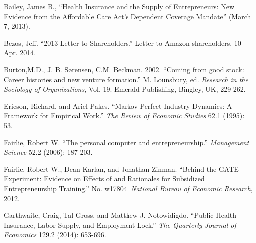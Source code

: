 \documentclass[12pt]{article}
\begin{document}
\begin{thebibliography}{99}

\begin{comment}

\bibitem{abadie}
Abadie, Alberto. ``Synthetic Control Methods for Comparative Case Studies: Estimating the Effect of California’s Tobacco Control Program.'' Journal of the American Statistical Association 105 (2010): 493-505

\bibitem{acharya}
Acharya, Viral, and Krishnamurthy Subramanian, 2009, Bankruptcy codes and innovation, \emph{Review of Financial Studies} 22, 4949-4988.

\bibitem{kaufman}
Atkinson, Robert D., Scott Andes. 2010 ``The 2010 State New Economy Index: Benchmarking Economic Transformation in the States'' The Information Technology and Innovation Foundation, Kauffman Foundation


\bibitem{bhide}
Bhide, Amar. \emph{The origin and evolution of new businesses}. New York: Oxford UP, 2000.




\end{comment}

Bailey, James B., ``Health Insurance and the Supply of Entrepreneurs: New Evidence from the Affordable Care Act's Dependent Coverage Mandate'' (March 7, 2013). 

Bezos, Jeff. ``2013 Letter to Shareholders.'' Letter to Amazon shareholders. 10 Apr. 2014.

Burton,M.D., J. B. S{\o}rensen, C.M. Beckman. 2002. ``Coming from good stock: Career histories and new venture formation.'' M. Lounsbury, ed. \emph{Research in the Sociology of Organizations}, Vol. 19. Emerald Publishing, Bingley, UK, 229-262.

Ericson, Richard, and Ariel Pakes. ``Markov-Perfect Industry Dynamics: A Framework for Empirical Work.'' \emph{The Review of Economic Studies} 62.1 (1995): 53.

Fairlie, Robert W. ``The personal computer and entrepreneurship.'' \emph{Management Science} 52.2 (2006): 187-203.

Fairlie, Robert W., Dean Karlan, and Jonathan Zinman. ``Behind the GATE Experiment: Evidence on Effects of and Rationales for Subsidized Entrepreneurship Training.'' No. w17804. \emph{National Bureau of Economic Research}, 2012.

Garthwaite, Craig, Tal Gross, and Matthew J. Notowidigdo. ``Public Health Insurance, Labor Supply, and Employment Lock.'' \emph{The Quarterly Journal of Economics} 129.2 (2014): 653-696.


\end{thebibliography}
\end{document}
